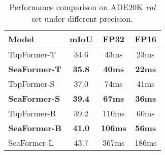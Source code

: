 \begin{table}[tb]
    \centering

        \begin{tabular}{l|c|c|c}
        
        \hline
        
        \hline
        
        \hline
        Model  &  mIoU & FP32 & FP16 \\
        \hline
        
        \hline
        \hline
        TopFormer-T	&34.6	&43ms	&23ms \\
        \textbf{SeaFormer-T}	&\textbf{35.8}	&\textbf{40ms}	&\textbf{22ms}\\
        TopFormer-S	&37.0	&74ms	&41ms\\
        \textbf{SeaFormer-S}	&\textbf{39.4}	&\textbf{67ms}	&\textbf{36ms}\\
        TopFormer-B	&39.2	&110ms	&60ms\\
        \textbf{SeaFormer-B}	&\textbf{41.0}	&\textbf{106ms}	&\textbf{56ms}\\
        SeaFormer-L	&43.7	&367ms	&186ms\\

        \hline
        
        \hline
        
        \hline
    \end{tabular}
    \caption{Performance comparison on ADE20K \textit{val} set under different precision.}
        \label{table_diff_precision}
\end{table}